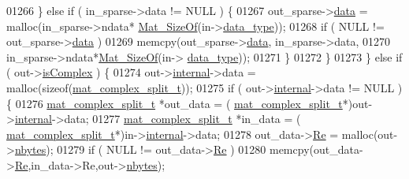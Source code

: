 \begin{DoxyCode}
{{{{{{{{{{{{{{{{{{{{{{{{{{{{{{01266                     \} \textcolor{keywordflow}{else} \textcolor{keywordflow}{if} ( in\_sparse->data != NULL ) \{
01267                         out\_sparse->\hyperlink{group___m_a_t_ae2c648cb9eac4ce47f26cddb44246152}{data} = malloc(in\_sparse->ndata*
      \hyperlink{group__mat__util_gab6774aabdc124c540c1e7686d0804940}{Mat\_SizeOf}(in->\hyperlink{group___m_a_t_ab6aafe9bd77f0f077852593dec438144}{data\_type}));
01268                         \textcolor{keywordflow}{if} ( NULL != out\_sparse->\hyperlink{group___m_a_t_ae2c648cb9eac4ce47f26cddb44246152}{data} )
01269                             memcpy(out\_sparse->\hyperlink{group___m_a_t_ae2c648cb9eac4ce47f26cddb44246152}{data}, in\_sparse->data,
01270                                 in\_sparse->ndata*\hyperlink{group__mat__util_gab6774aabdc124c540c1e7686d0804940}{Mat\_SizeOf}(in->
      \hyperlink{group___m_a_t_ab6aafe9bd77f0f077852593dec438144}{data\_type}));
01271                     \}
01272                 \}
01273             \} \textcolor{keywordflow}{else} \textcolor{keywordflow}{if} ( out->\hyperlink{group___m_a_t_aeb03b3a69f108dc05470b00443a43739}{isComplex} ) \{
01274                 out->\hyperlink{group___m_a_t_a6e97e3ed9f40c49322c18561c2a94e92}{internal}->data = malloc(\textcolor{keyword}{sizeof}(\hyperlink{group___m_a_t_structmat__complex__split__t}{mat\_complex\_split\_t}));
01275                 \textcolor{keywordflow}{if} ( out->\hyperlink{group___m_a_t_a6e97e3ed9f40c49322c18561c2a94e92}{internal}->data != NULL ) \{
01276                     \hyperlink{group___m_a_t_structmat__complex__split__t}{mat\_complex\_split\_t} *out\_data = (
      \hyperlink{group___m_a_t_structmat__complex__split__t}{mat\_complex\_split\_t}*)out->\hyperlink{group___m_a_t_a6e97e3ed9f40c49322c18561c2a94e92}{internal}->data;
01277                     \hyperlink{group___m_a_t_structmat__complex__split__t}{mat\_complex\_split\_t} *in\_data  = (
      \hyperlink{group___m_a_t_structmat__complex__split__t}{mat\_complex\_split\_t}*)in->\hyperlink{group___m_a_t_a6e97e3ed9f40c49322c18561c2a94e92}{internal}->data;
01278                     out\_data->\hyperlink{group___m_a_t_a484a93607508adac2bce53a0252e0325}{Re} = malloc(out->\hyperlink{group___m_a_t_abf1c844540503be2df9bb3db93cfe307}{nbytes});
01279                     \textcolor{keywordflow}{if} ( NULL != out\_data->\hyperlink{group___m_a_t_a484a93607508adac2bce53a0252e0325}{Re} )
01280                         memcpy(out\_data->\hyperlink{group___m_a_t_a484a93607508adac2bce53a0252e0325}{Re},in\_data->Re,out->\hyperlink{group___m_a_t_abf1c844540503be2df9bb3db93cfe307}{nbytes});
}}}}}}}}}}}}}}}}}}}}}}}}}}}}}}
\end{DoxyCode}
